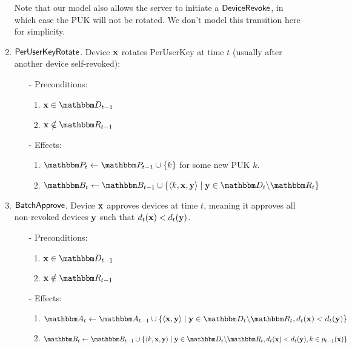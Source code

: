 \begin{definition}
\begin{enumerate}
\begin{itemize}
\begin{enumerate}
              \label{e:revoke:box}
      \end{enumerate}
    \end{itemize}
    Note that our model also allows the server to initiate a $\mathsf{DeviceRevoke}{}$, in which case the PUK will not be rotated. We don't model this transition here for simplicity.
\item $\mathsf{PerUserKeyRotate}{}$. Device $\mathbf{x}$ rotates PerUserKey at
  time $t$ (usually after another device self-revoked):
  \begin{itemize}
    \item[-] Preconditions:
    \begin{enumerate}
      \item $\zdev{x} \in \zset{d}_{t-1}$
      \item $\zdev{x} \notin \zset{r}_{t-1}$
   \end{enumerate}
    \item[-] Effects:
    \begin{enumerate}
      \item $\zset{p}_t \leftarrow \zset{p}_{t-1} \cup \left\{ \zkey{k} \right\}$ 
            for some new PUK $k$.
        \item $\zset{b}_t \leftarrow \zset{b}_{t-1} \cup \left\{ \langle \zkey{k}, \zdev{x}, \zdev{y} \rangle \;|\; \zdev{y} \in \zset{d}_t \setsub \zset{r}_t \right\}$
    \end{enumerate}
  \end{itemize}
\item $\mathsf{BatchApprove}{}$. Device $\mathbf{x}$ approves devices at time
   $t$, meaning it approves all non-revoked devices $\mathbf{y}$ such that 
   $d_t(\mathbf{x}) < d_t(\mathbf{y})$.
   \begin{itemize}
     \item[-]Preconditions:
     \begin{enumerate}
       \item $\zdev{x} \in \zset{d}_{t-1}$
       \item $\zdev{x} \notin \zset{r}_{t-1}$
     \end{enumerate} 
     \item[-]Effects: 
     \begin{enumerate}
      \item $\zset{a}_t \leftarrow \zset{a}_{t-1} \cup  
      \left\{ \langle \zdev{x}, \zdev{y} \rangle  \;|\; \zdev{y} \in \zset{d}_{t} \setsub \zset{r}_{t},
      \zdevtime_t(\zdev{x}) < \zdevtime_t(\zdev{y})\right \}$
       \label{e:approve:add_to_a}
       \label{e:approve:devices}
      \item $\zset{b}_{t} \leftarrow \zset{b}_{t-1} \cup
               \left\{ \langle \zkey{k}, \zdev{x}, \zdev{y} \rangle 
               \;|\; \zdev{y} \in \zset{d}_{t} \setsub \zset{r}_{t},
               \zdevtime_t(\zdev{x}) < \zdevtime_t(\zdev{y}),
               \zkey{k} \in \zpuks_{t-1}(\zdev{x})
               \right\}$
               \label{e:approve:box}
     \end{enumerate}
   \end{itemize}
\end{enumerate}


\end{definition}
